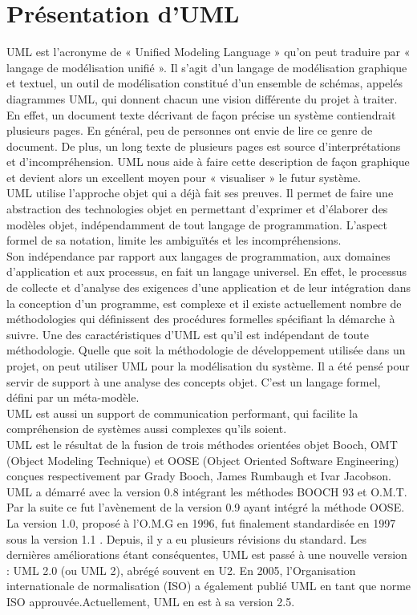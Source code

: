 \section{Présentation d'UML}
UML est l’acronyme de « Unified Modeling Language » qu'on peut traduire par « langage de modélisation unifié ». Il s'agit d'un langage de modélisation graphique et textuel, un outil de modélisation constitué d’un ensemble de schémas, appelés diagrammes UML, qui donnent chacun une vision différente du projet à traiter. En effet, un document texte décrivant de façon précise un système contiendrait plusieurs pages. En général, peu de personnes ont envie de lire ce genre de document. De plus, un long texte de plusieurs pages est source d’interprétations et d’incompréhension. UML nous aide à faire cette description de façon graphique et devient alors un excellent moyen pour « visualiser » le futur système.\\
UML utilise l'approche objet qui a déjà fait ses preuves. Il permet de faire une abstraction des technologies objet en permettant d’exprimer et d’élaborer des modèles objet, indépendamment de tout langage de programmation. L'aspect formel de sa notation, limite les ambiguïtés et les incompréhensions.\\
Son indépendance par rapport aux langages de programmation, aux domaines d'application et
aux processus, en fait un langage universel. En effet, le processus de collecte et d'analyse des exigences d'une application et de leur intégration dans la conception d'un programme, est complexe et il existe actuellement nombre de  méthodologies qui définissent des procédures formelles spécifiant la démarche à suivre. Une des caractéristiques d'UML est qu'il est indépendant de toute méthodologie. Quelle que soit la méthodologie de développement utilisée dans un projet, on peut utiliser UML pour la modélisation du système. Il a été pensé pour servir de support à une analyse des concepts objet. C’est un langage formel, défini par un méta-modèle.\\
UML est aussi un support de communication performant, qui facilite la compréhension de systèmes  aussi complexes qu'ils soient.\\
UML est le résultat de la fusion de trois méthodes orientées objet Booch, OMT (Object Modeling Technique) et OOSE (Object Oriented Software Engineering) conçues respectivement par Grady Booch, James Rumbaugh et Ivar Jacobson. UML a démarré avec la version 0.8 intégrant les méthodes BOOCH 93 et O.M.T. Par la suite ce fut l'avènement de la version 0.9 ayant intégré la méthode OOSE. La version 1.0, proposé à l'O.M.G en 1996, fut finalement standardisée en 1997 sous la version 1.1 . Depuis, il y a eu plusieurs révisions du standard. Les dernières améliorations étant conséquentes, UML est passé à une nouvelle version : UML 2.0 (ou UML 2), abrégé souvent en U2. En 2005, l'Organisation internationale de normalisation (ISO) a également publié UML en tant que norme ISO approuvée.Actuellement, UML en est à sa version 2.5.

